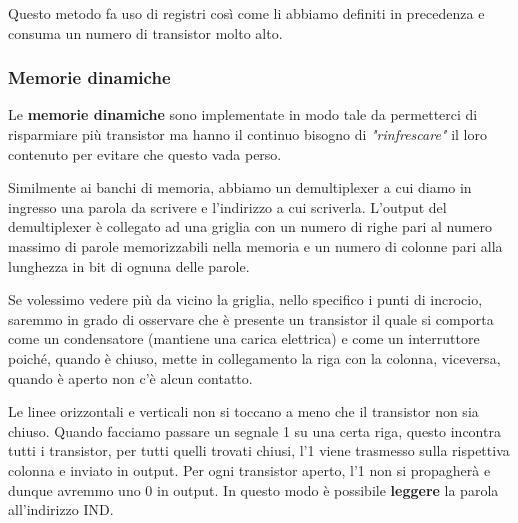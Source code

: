 Questo metodo fa uso di registri così come li abbiamo definiti in precedenza e consuma un numero di
transistor molto alto.

\subsubsection{Memorie dinamiche}
Le \textbf{memorie dinamiche} sono implementate in modo tale da permetterci di risparmiare più
transistor ma hanno il continuo bisogno di \emph{"rinfrescare"} il loro contenuto per evitare che
questo vada perso.

Similmente ai banchi di memoria, abbiamo un demultiplexer a cui diamo in ingresso una parola da
scrivere e l'indirizzo a cui scriverla. L'output del demultiplexer è collegato ad una griglia
con un numero di righe pari al numero massimo di parole memorizzabili nella memoria e un numero
di colonne pari alla lunghezza in bit di ognuna delle parole.
\begin{center}
\end{center}
Se volessimo vedere più da vicino la griglia, nello specifico i punti di incrocio, saremmo in grado
di osservare che è presente un transistor il quale si comporta come un condensatore (mantiene una
carica elettrica) e come un interruttore poiché, quando è chiuso, mette in collegamento la riga con
la colonna, viceversa, quando è aperto non c'è alcun contatto.
\begin{center}
\end{center}
Le linee orizzontali e verticali non si toccano a meno che il transistor non sia chiuso. Quando
facciamo passare un segnale 1 su una certa riga, questo incontra tutti i transistor, per tutti
quelli trovati chiusi, l'1 viene trasmesso sulla rispettiva colonna e inviato in output. Per ogni
transistor aperto, l'1 non si propagherà e dunque avremmo uno 0 in output. In questo modo è
possibile \textbf{leggere} la parola all'indirizzo IND.


